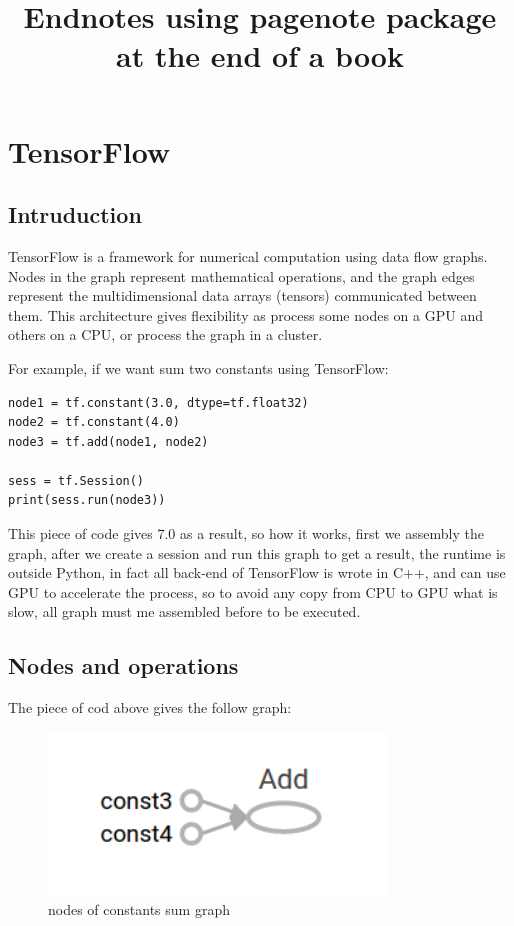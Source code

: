 \documentclass[11pt,openany]{book}
\title{Endnotes using pagenote package at the end of a book}
\begin{document}
\chapter{TensorFlow}
\section{Intruduction}
TensorFlow is a framework for numerical computation using data flow graphs. Nodes in the graph represent mathematical operations, and the graph edges represent the multidimensional data arrays (tensors) communicated between them. This architecture gives flexibility as process some nodes on a GPU and others on a CPU, or process the graph in a cluster.

For example, if we want sum two constants using TensorFlow:

\begin{verbatim}
node1 = tf.constant(3.0, dtype=tf.float32)
node2 = tf.constant(4.0)
node3 = tf.add(node1, node2)

sess = tf.Session()
print(sess.run(node3))
\end{verbatim}

This piece of code gives 7.0 as a result, so how it works, first we assembly the graph, after we create a session and run this graph to get a result, the runtime is outside Python, in fact all back-end of TensorFlow is wrote in C++, and can use GPU to accelerate the process, so to avoid any copy from CPU to GPU what is slow, all graph must me assembled before to be executed.

\section{Nodes and operations}
The piece of cod above gives the follow graph:

\begin{figure}[h]
    \centering
    \includegraphics[width=0.8\textwidth]{img/const_add.png}
    \caption{nodes of constants sum graph}
    \label{fig:const_add}
\end{figure}
\end{document}
